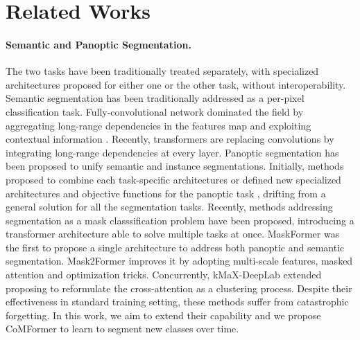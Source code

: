 \documentclass[10pt,twocolumn,letterpaper]{article}
\begin{document}
\section{Related Works}
\label{sec:related}
\vspace{-1.5em}\noindent\paragraph{Semantic and Panoptic Segmentation.}
The two tasks have been traditionally treated separately, with specialized architectures proposed for either one or the other task, without interoperability. 
Semantic segmentation has been traditionally addressed as a per-pixel classification task. Fully-convolutional network \cite{long2015fcn} dominated the field by aggregating long-range dependencies in the features map \cite{chen2018deeplab, chen2017deeplabv3, zhao2017PSPNet} and exploiting contextual information \cite{fu2019DANet, huang2020ccnet, yuan2018ocnet, zhao2018psanet, yuan2020ocr}. Recently, transformers \cite{jain2021semask, xie2021segformer, strudel2021segmenter} are replacing convolutions by integrating long-range dependencies at every layer.
Panoptic segmentation \cite{kirillov2019panoptic} has been proposed to unify semantic and instance segmentations. Initially, methods proposed to combine each task-specific architectures \cite{cheng2020panoptic, kirillov2019panopticpyr, li2022fully, Porzi_2019_CVPR} or defined new specialized architectures and objective functions for the panoptic task \cite{carion2020end, wang2021max, wang2020axial}, drifting from a general solution for all the segmentation tasks.
Recently, methods addressing segmentation as a mask classsification problem \cite{wang2021max, yu2022kMax, cheng2021masked, cheng2021maskformer} have been proposed, introducing a transformer architecture able to solve multiple tasks at once. MaskFormer \cite{cheng2021maskformer} was the first to propose a single architecture to address both panoptic and semantic segmentation. Mask2Former \cite{cheng2021masked} improves it by adopting multi-scale features, masked attention and optimization tricks. Concurrently, kMaX-DeepLab \cite{yu2022kMax} extended \cite{wang2021max} proposing to reformulate the cross-attention as a clustering process.
Despite their effectiveness in standard training setting, these methods suffer from catastrophic forgetting. In this work, we aim to extend their capability and we propose CoMFormer to learn to segment new classes over time.
\end{document}
